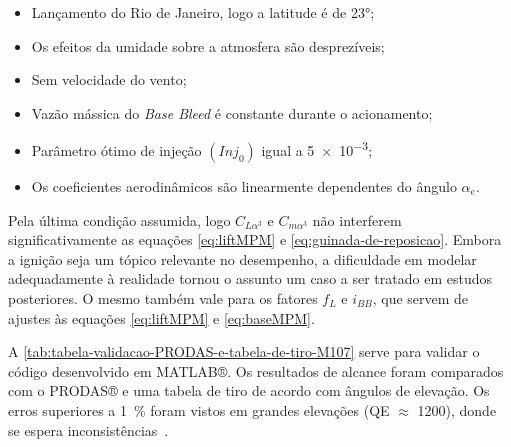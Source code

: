\begin{itemize}
    \item Lançamento do Rio de Janeiro, logo a latitude é de \ang{23};
    \item Os efeitos da umidade sobre a atmosfera são desprezíveis;
    \item Sem velocidade do vento;
    \item Vazão mássica do \textit{Base Bleed} é constante durante o acionamento;
    \item Parâmetro ótimo de injeção \(\left(Inj_{0}\right)\) igual a \num{5e-3};
    \item Os coeficientes aerodinâmicos são linearmente dependentes do ângulo \(\alpha_{e}\).
\end{itemize}

Pela última condição assumida, logo \(C_{L\alpha^{3}}\) e \(C_{m\alpha^{3}}\) não interferem significativamente as equações \ref{eq:liftMPM} e \ref{eq:guinada-de-reposicao}. Embora a ignição seja um tópico relevante no desempenho, a dificuldade em modelar adequadamente à realidade tornou o assunto um caso a ser tratado em estudos posteriores. O mesmo também vale para os fatores \(f_{L}\) e \(i_{BB}\), que servem de ajustes às equações \ref{eq:liftMPM} e \ref{eq:baseMPM}.

A \autoref{tab:tabela-validacao-PRODAS-e-tabela-de-tiro-M107} serve para validar o código desenvolvido em MATLAB®. Os resultados de alcance foram comparados com o PRODAS® e uma tabela de tiro de acordo com ângulos de elevação. Os erros superiores a \qty{1}{\percent} foram vistos em grandes elevações (QE \(\approx\) \qty{1200}{\milliradian}), donde se espera inconsistências~\cite{McCoy2012,Carlucci2018}.


